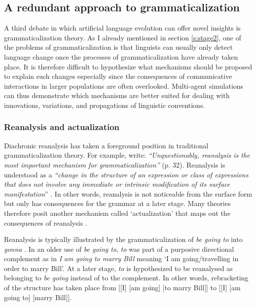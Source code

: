 \subsection{A redundant approach to grammaticalization}
\label{s:actualization}

A third debate in which artificial language evolution can offer novel insights is grammaticalization theory. As I already mentioned in section \ref{s:stage2}, one of the problems of grammaticalization is that linguists can usually only detect language change once the processes of grammaticalization have already taken place. It is therefore difficult to hypothesize what mechanisms should be proposed to explain such changes especially since the consequences of communicative interactions in larger populations are often overlooked. Multi-agent simulations can thus demonstrate which mechanisms are better suited for dealing with innovations, variations, and propagations of linguistic conventions.


\subsubsection{Reanalysis and actualization} 
Diachronic reanalysis has taken a foreground position in traditional grammaticalization theory. For example, \citet{hopper93grammaticalization} write: {\em ``Unquestionably, reanalysis is the most important mechanism for grammaticalization''} (p. 32). Reanalysis is understood as a {\em ``change in the structure of an expression or class of expressions that does not involve any immediate or intrinsic modification of its surface manifestation}'' \citep[p. 59]{langacker77syntactic}. In other words, reanalysis is not noticeable from the surface form but only has consequences for the grammar at a later stage. Many theories therefore posit another mechanism called `actualization' that maps out the consequences of reanalysis \citep{timberlake77reanalysis}.

Reanalysis is typically illustrated by the grammaticalization of {\em be going to} into {\em gonna} \citep[p. 2--4]{hopper93grammaticalization}. In an older use of {\em be going to}, {\em to} was part of a purposive directional complement as in {\em I am going to marry Bill} meaning `I am going/travelling in order to marry Bill'. At a later stage, {\em to} is hypothesized to be reanalysed as belonging to {\em be going} instead of to the complement. In other words, rebracketing of the structure has taken place from [[I] [am going] [to marry Bill]] to [[I] [am going to] [marry Bill]].

